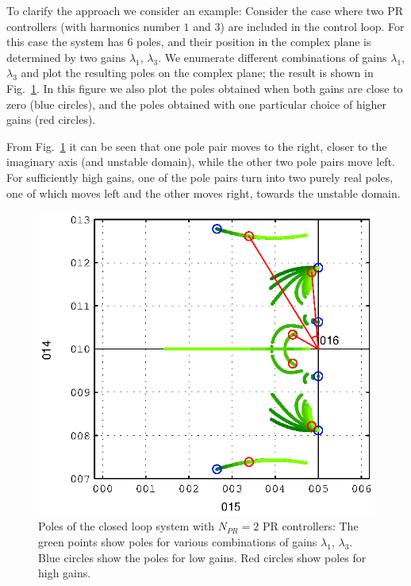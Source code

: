 \documentclass[conference,10pt]{IEEEtran}
\begin{document}
To clarify the approach we consider an example: Consider the case where two PR controllers (with harmonics number $1$ and $3$) are included in the control loop. For this case the system has $6$ poles, and their position in the complex plane is determined by  two gains $\lambda_1$, $\lambda_3$.
We enumerate different combinations of gains $\lambda_1$, $\lambda_3$ and plot the resulting poles on the complex plane; the result is shown in Fig.~\ref{fig:PoleExample}. In this figure we also plot the poles obtained when both gains are close to zero (blue circles), and the poles obtained with one particular choice of higher gains (red circles).

From Fig.~\ref{fig:PoleExample} it can be seen that one pole pair moves to the right, closer to the imaginary axis (and unstable domain), while the other two pole pairs move left. For sufficiently high gains, one of the pole pairs turn into two purely real poles, one of which moves left and the other moves right, towards the unstable domain.
\begin{figure}[!h]
\centering

\includegraphics{fig/root_locus_2D}
\caption{Poles of the closed loop system with $N_{PR}=2$ PR controllers: The green points show poles for various combinations of gains $\lambda_1$,
$\lambda_3$. Blue circles show the poles for low gains. Red circles show poles for high gains. }
\label{fig:PoleExample}
\end{figure}
\end{document}
